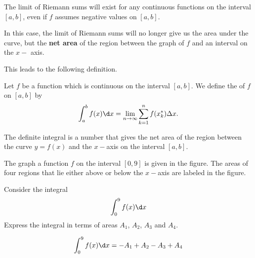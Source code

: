 \documentclass{ximera}
\begin{document}
The limit of Riemann sums will exist for any continuous functions on the interval $[a,b]$, even if $f$ assumes negative values on $[a,b]$.

In this case, the limit of Riemann sums will no longer give us the area under the curve, but the  \textbf{net area} of the region between the graph of $f$ and an interval on the $x-$ axis.

This leads to the following definition.
\begin{definition}
Let $f$ be a function which is continuous on the interval $[a,b]$. We define the  of $f$ on $[a,b]$ by
\[
\int_a^b f(x) \d x=\lim_{n\to\infty}\sum_{k=1}^n f(x_k^*)\Delta x.
\]
\end{definition}
The definite integral is a number that gives the net area of the region between the curve $y=f(x)$ and the $x-$axis on the interval $[a,b]$.  
 
\begin{example} The graph a function $f$ on the interval $[0,9]$ is given in the figure. The areas of  four regions that lie either above or below the $x-$axis are labeled in the figure.

 \begin{image}
\end{image}
Consider the integral
\[
\int_0^9 f(x) \d x
\]
Express the integral in terms of areas $A_1$, $A_2$, $A_3$ and $A_4$.
\begin{explanation}
\begin{align*}
    \int_0^9 f(x) \d x&= -A_1+A_2-A_3+A_4\\
\end{align*}

\end{explanation}
\end{example}
\end{document}
